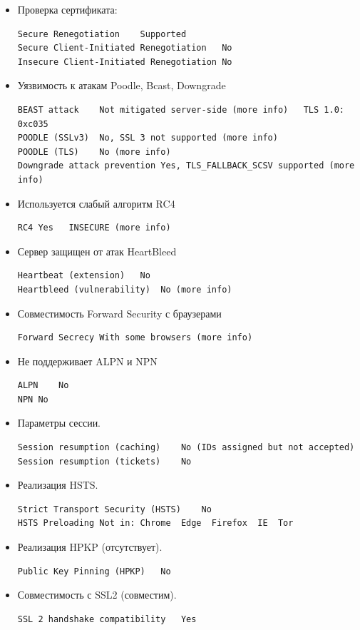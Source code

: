 \documentclass[10pt,a4paper]{report}
\begin{document}
			\begin{itemize}
				\item Проверка сертификата:
				\begin{lstlisting}
Secure Renegotiation	Supported
Secure Client-Initiated Renegotiation	No
Insecure Client-Initiated Renegotiation	No
				\end{lstlisting}
				
				\item Уязвимость к атакам Poodle, Bcast, Downgrade
				\begin{lstlisting}
BEAST attack	Not mitigated server-side (more info)   TLS 1.0: 0xc035
POODLE (SSLv3)	No, SSL 3 not supported (more info)
POODLE (TLS)	No (more info)
Downgrade attack prevention	Yes, TLS_FALLBACK_SCSV supported (more info)
				\end{lstlisting}
				
				\item Используется слабый алгоритм RC4
				\begin{lstlisting}
RC4	Yes   INSECURE (more info)
				\end{lstlisting}
				
				\item Сервер защищен от атак HeartBleed
				\begin{lstlisting}
Heartbeat (extension)	No
Heartbleed (vulnerability)	No (more info)
				\end{lstlisting}
				
				\item Совместимость Forward Security с браузерами
				\begin{lstlisting}
Forward Secrecy	With some browsers (more info)
				\end{lstlisting}
				
				\item Не поддерживает ALPN и NPN
				\begin{lstlisting}
ALPN	No
NPN	No
				\end{lstlisting}
				
				\item Параметры сессии.
				\begin{lstlisting}
Session resumption (caching)	No (IDs assigned but not accepted)
Session resumption (tickets)	No
				\end{lstlisting}
				
				\item Реализация HSTS.
				\begin{lstlisting}
Strict Transport Security (HSTS)	No
HSTS Preloading	Not in: Chrome  Edge  Firefox  IE  Tor 
				\end{lstlisting}
				
				\item Реализация HPKP (отсутствует).
				\begin{lstlisting}
Public Key Pinning (HPKP)	No
				\end{lstlisting}
				
				\item Совместимость с SSL2 (совместим).
				\begin{lstlisting}
SSL 2 handshake compatibility	Yes
				\end{lstlisting}
			\end{itemize}
		
\end{document}
